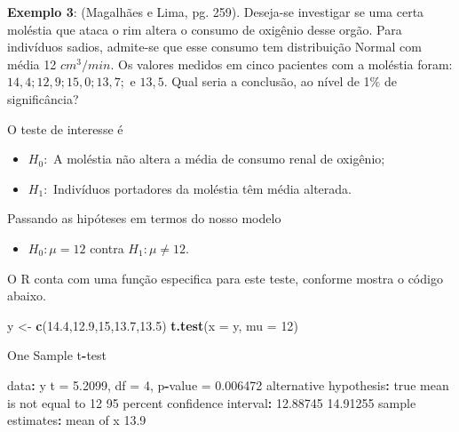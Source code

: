 \documentclass[10pt,a4paper]{book}
\newenvironment{Shaded}{\begin{snugshade}}{\end{snugshade}}
\newcommand{\KeywordTok}[1]{\textcolor[rgb]{0.13,0.29,0.53}{\textbf{#1}}}
\newcommand{\DataTypeTok}[1]{\textcolor[rgb]{0.13,0.29,0.53}{#1}}
\newcommand{\DecValTok}[1]{\textcolor[rgb]{0.00,0.00,0.81}{#1}}
\newcommand{\FloatTok}[1]{\textcolor[rgb]{0.00,0.00,0.81}{#1}}
\newcommand{\StringTok}[1]{\textcolor[rgb]{0.31,0.60,0.02}{#1}}
\newcommand{\OperatorTok}[1]{\textcolor[rgb]{0.81,0.36,0.00}{\textbf{#1}}}
\newcommand{\NormalTok}[1]{#1}
\providecommand{\tightlist}{%
  \setlength{\itemsep}{0pt}\setlength{\parskip}{0pt}}
\begin{document}
\textbf{Exemplo 3}: (Magalhães e Lima, pg. 259). Deseja-se investigar se
uma certa moléstia que ataca o rim altera o consumo de oxigênio desse
orgão. Para indivíduos sadios, admite-se que esse consumo tem
distribuição Normal com média 12 \(cm^3/min\). Os valores medidos em
cinco pacientes com a moléstia foram: \(14,4;12,9;15,0;13,7;\) e
\(13,5\). Qual seria a conclusão, ao nível de 1\(\%\) de significância?

O teste de interesse é

\begin{itemize}
\tightlist
\item
  \(H_0:\) A moléstia não altera a média de consumo renal de oxigênio;
\item
  \(H_1:\) Indivíduos portadores da moléstia têm média alterada.
\end{itemize}

Passando as hipóteses em termos do nosso modelo

\begin{itemize}
\tightlist
\item
  \(H_0: \mu = 12\) contra \(H_1: \mu \neq 12\).
\end{itemize}

O R conta com uma função especifica para este teste, conforme mostra o
código abaixo.

\begin{Shaded}
\begin{Highlighting}[]
\NormalTok{y <-}\StringTok{ }\KeywordTok{c}\NormalTok{(}\FloatTok{14.4}\NormalTok{,}\FloatTok{12.9}\NormalTok{,}\DecValTok{15}\NormalTok{,}\FloatTok{13.7}\NormalTok{,}\FloatTok{13.5}\NormalTok{)}
\KeywordTok{t.test}\NormalTok{(}\DataTypeTok{x =}\NormalTok{ y, }\DataTypeTok{mu =} \DecValTok{12}\NormalTok{)}

\NormalTok{    One Sample t}\OperatorTok{-}\NormalTok{test}

\NormalTok{data}\OperatorTok{:}\StringTok{  }\NormalTok{y}
\NormalTok{t =}\StringTok{ }\FloatTok{5.2099}\NormalTok{, df =}\StringTok{ }\DecValTok{4}\NormalTok{, p}\OperatorTok{-}\NormalTok{value =}\StringTok{ }\FloatTok{0.006472}
\NormalTok{alternative hypothesis}\OperatorTok{:}\StringTok{ }\NormalTok{true mean is not equal to }\DecValTok{12}
\DecValTok{95}\NormalTok{ percent confidence interval}\OperatorTok{:}
\StringTok{ }\FloatTok{12.88745} \FloatTok{14.91255}
\NormalTok{sample estimates}\OperatorTok{:}
\NormalTok{mean of x }
     \FloatTok{13.9} 
\end{Highlighting}
\end{Shaded}
\end{document}
